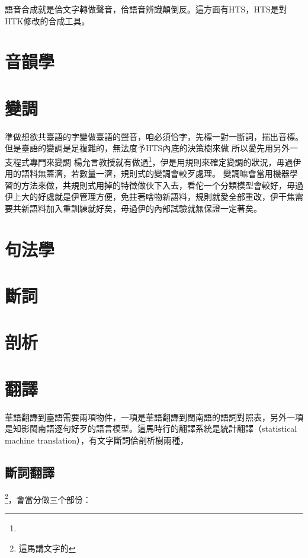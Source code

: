 \documentclass[final,oneside,onecolumn,12pt,a4paper]{book}%
\begin{document}
語音合成就是佮文字轉做聲音，佮語音辨識顛倒反。這方面有HTS，HTS是對HTK修改的合成工具。


\section{音韻學}
\label{節：音韻學}
\section{變調}
\label{節：變調}

準做想欲共臺語的字變做臺語的聲音，咱必須佮字，先標一對一斷詞，揣出音標。
但是臺語的變調是足複雜的，無法度予HTS內底的決策樹來做
所以愛先用另外一支程式專門來變調
楊允言教授就有做過\footnote{}，伊是用規則來確定變調的狀況，毋過伊用的語料無蓋濟，若數量一濟，規則式的變調會較歹處理。
變調嘛會當用機器學習的方法來做，共規則式用掉的特徵做伙下入去，看佗一个分類模型會較好，毋過伊上大的好處就是伊管理方便，免拄著啥物新語料，規則就愛全部重改，伊干焦需要共新語料加入重訓練就好矣，毋過伊的內部試驗就無保證一定著矣。

\section{句法學}
\label{節：句法學}

\section{斷詞}
\label{節：斷詞}

\section{剖析}
\label{節：剖析}

\section{翻譯}
\label{節：翻譯}
華語翻譯到臺語需要兩項物件，一項是華語翻譯到閩南語的語詞對照表，另外一項是知影閩南語逐句好歹的語言模型。這馬時行的翻譯系統是統計翻譯（statistical machine translation），有文字斷詞佮剖析樹兩種，
\subsection{斷詞翻譯}
\label{小節：斷詞翻譯}
\footnote{這馬講文字的}，會當分做三个部份：
\end{document}
